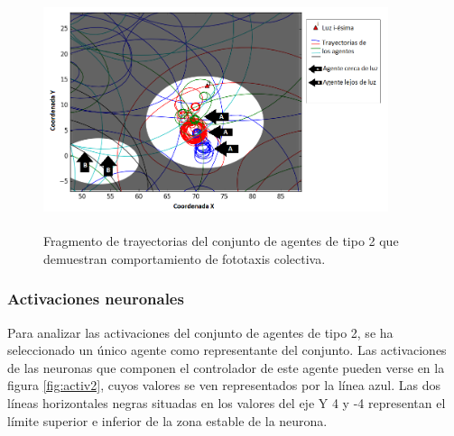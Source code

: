 \begin{figure}[H]
    \centering
    \includegraphics[width=0.9\textwidth,height=7cm]{Imagenes/Agente2Trayectoria}
    \caption{Fragmento de trayectorias del conjunto de agentes de tipo 2 que demuestran comportamiento de fototaxis colectiva.}
    \label{fig:agente2Trayectoria}
\end{figure}

\subsubsection{Activaciones neuronales}
Para analizar las activaciones del conjunto de agentes de tipo 2, se ha seleccionado un único agente como representante del conjunto. Las activaciones de las neuronas que componen el controlador de este agente pueden verse en la figura \ref{fig:activ2}, cuyos valores se ven representados por la línea azul. Las dos líneas horizontales negras situadas en los valores del eje Y 4 y -4 representan
el límite superior e inferior de la zona estable de la neurona.

